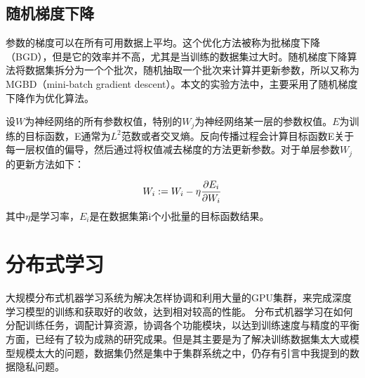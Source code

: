 \documentclass[zihao = -4,cn]{oucart}
\begin{document}
\subsection{随机梯度下降}
参数的梯度可以在所有可用数据上平均。这个优化方法被称为批梯度下降（BGD），但是它的效率并不高，尤其是当训练的数据集过大时。随机梯度下降算法将数据集拆分为一个个批次，随机抽取一个批次来计算并更新参数，所以又称为MGBD（mini-batch gradient descent）。本文的实验方法中，主要采用了随机梯度下降作为优化算法。\par
设$W$为神经网络的所有参数权值，特别的$W_j$为神经网络某一层的参数权值。$E$为训练的目标函数，E通常为$L^2$范数或者交叉熵\cite{murphy2012machine}。反向传播过程会计算目标函数E关于每一层权值的偏导，然后通过将权值减去梯度的方法更新参数。对于单层参数$W_j$的更新方法如下：\par
\begin{equation}
W_i := W_i - \eta \frac{\partial E_i}{\partial W_i}\\
\end{equation}
其中$\eta$是学习率，$E_i$是在数据集第i个小批量的目标函数结果。

\section{分布式学习}
大规模分布式机器学习系统为解决怎样协调和利用大量的GPU集群，来完成深度学习模型的训练和获取好的收敛，达到相对较高的性能。 分布式机器学习在如何分配训练任务，调配计算资源，协调各个功能模块，以达到训练速度与精度的平衡方面，已经有了较为成熟的研究成果\cite{ho2013more}\cite{xing2015petuum}\cite{wei2015managed}。但是其主要是为了解决训练数据集太大或模型规模太大的问题，数据集仍然是集中于集群系统之中，仍存有引言中我提到的数据隐私问题。
\end{document}
